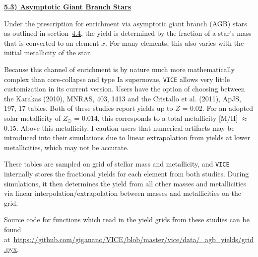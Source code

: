 \documentclass{report}
\begin{document}
\newpage 
\noindent 
\begin{center} 
\hypertarget{yields:agb}{
	\underline{\LARGE
		\textbf{5.3) Asymptotic Giant Branch Stars} 
	}
}
\end{center}
Under the prescription for enrichment via asymptotic giant branch (AGB) stars 
as outlined in section~\hyperlink{enrichment:agb}{4.4}, the yield is 
determined by the fraction of a star's mass that is converted to an element 
$x$. For many elements, this also varies with the initial metallicity of the 
star. 
\par
Because this channel of enrichment is by nature much more mathematically 
complex than core-collapse and type Ia supernovae, \texttt{VICE} allows very 
little customization in its current version. Users have the option of choosing 
between the Karakas (2010), MNRAS, 403, 1413 and the Cristallo et al. (2011), 
ApJS, 197, 17 tables. Both of these studies report yields up to $Z$ = 0.02. 
For an adopted solar metallicity of $Z_\odot$ = 0.014, this corresponds to a 
total metallicity [M/H] $\approx$ 0.15. Above this metallicity, I caution 
users that numerical artifacts may be introduced into their simulations due to 
linear extrapolation from yields at lower metallicities, which may not be 
accurate. 
\par
These tables are sampled on grid of stellar mass and metallicity, and 
\texttt{VICE} internally stores the fractional yields for each element from 
both studies. During simulations, it then determines the yield from all other 
masses and metallicities via linear interpolation/extrapolation between 
masses and metallicities on the grid. 
\par
Source code for functions which read in the yield grids from these studies can 
be found at~\url{https://github.com/giganano/VICE/blob/master/vice/data/_agb_yields/grid.pyx}. 
\end{document}
